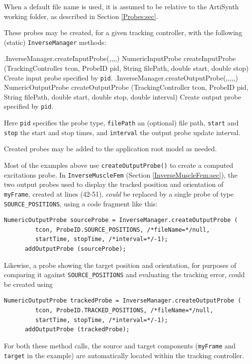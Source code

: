 \begin{sideblock}
When a default file name is used, it is assumed to be relative to the ArtiSynth
working folder, as described in Section \ref{Probes:sec}.
\end{sideblock}

These probes may be created, for a given tracking controller, with the
following (static) {\tt InverseManager} methods:
%
\begin{methodtable}{0.6}{0.4}
\midline
%
\methodentry
{\inverse.InverseManager.createInputProbe(,,,,)}%
{NumericInputProbe createInputProbe (TrackingController tcon,\brh
ProbeID pid, String filePath, double start, double stop)}%
{Create input probe specified by {\tt pid}.}%
%
\methodspace{0.5em}%
\methodentry
{\inverse.InverseManager.createOutputProbe(,,,,,)}%
{NumericOutputProbe createOutputProbe (TrackingController tcon,\brh
ProbeID pid, String filePath, double start, double stop, \brh double interval)}%
{Create output probe specified by {\tt pid}.}%
%
\midline
\end{methodtable}
%
Here {\tt pid} specifies the probe type, {\tt filePath} an (optional) file
path, {\tt start} and {\tt stop} the start and stop times, and {\tt interval}
the output probe update interval.

Created probes may be added to the application root model as needed.

Most of the examples above use {\tt createOutputProbe()} to create a computed
excitations probe. In {\tt InverseMuscleFem}
(Section \ref{InverseMuscleFem:sec}), the two output probes used to display the
tracked position and orientation of {\tt myFrame}, created at lines (42-51),
{\it could} be replaced by a single probe of type {\tt SOURCE\_POSITIONS},
using a code fragment like this:
%
\begin{lstlisting}[]
      NumericOutputProbe sourceProbe = InverseManager.createOutputProbe (
         tcon, ProbeID.SOURCE_POSITIONS, /*fileName=*/null,
         startTime, stopTime, /*interval=*/-1);
      addOutputProbe (sourceProbe);
\end{lstlisting}
%
Likewise, a probe showing the target position and orientation, for purposes of
comparing it against {\tt SOURCE\_POSITIONS} and evaluating the tracking error,
could be created using
%
\begin{lstlisting}[]
      NumericOutputProbe trackedProbe = InverseManager.createOutputProbe (
         tcon, ProbeID.TRACKED_POSITIONS, /*fileName=*/null,
         startTime, stopTime, /*interval=*/-1);
      addOutputProbe (trackedProbe);
\end{lstlisting}
%
For both these method calls, the source and target components ({\tt myFrame}
and {\tt target} in the example) are automatically located within the tracking
controller.

